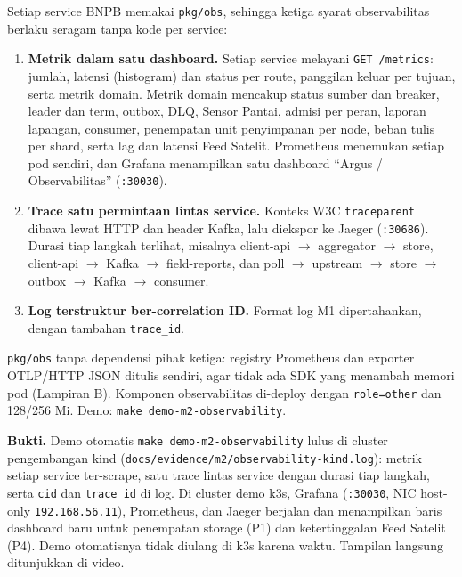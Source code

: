 Setiap service BNPB memakai \texttt{pkg/\allowbreak{}obs}, sehingga ketiga syarat observabilitas berlaku seragam tanpa kode per service:


\begin{enumerate}
\item \textbf{Metrik dalam satu dashboard.} Setiap service melayani \texttt{GET /\allowbreak{}metrics}: jumlah, latensi (histogram) dan status per route, panggilan keluar per tujuan, serta metrik domain. Metrik domain mencakup status sumber dan breaker, leader dan term, outbox, DLQ, Sensor Pantai, admisi per peran, laporan lapangan, consumer, penempatan unit penyimpanan per node, beban tulis per shard, serta lag dan latensi Feed Satelit. Prometheus menemukan setiap pod sendiri, dan Grafana menampilkan satu dashboard ``Argus / Observabilitas'' (\texttt{:30030}).
\item \textbf{Trace satu permintaan lintas service.} Konteks W3C \texttt{traceparent} dibawa lewat HTTP dan header Kafka, lalu diekspor ke Jaeger (\texttt{:30686}). Durasi tiap langkah terlihat, misalnya client-api $\rightarrow$ aggregator $\rightarrow$ store, client-api $\rightarrow$ Kafka $\rightarrow$ field-reports, dan poll $\rightarrow$ upstream $\rightarrow$ store $\rightarrow$ outbox $\rightarrow$ Kafka $\rightarrow$ consumer.
\item \textbf{Log terstruktur ber-correlation ID.} Format log M1 dipertahankan, dengan tambahan \texttt{trace\_\allowbreak{}id}.
\end{enumerate}

\texttt{pkg/\allowbreak{}obs} tanpa dependensi pihak ketiga: registry Prometheus dan exporter OTLP/HTTP JSON ditulis sendiri, agar tidak ada SDK yang menambah memori pod (Lampiran B). Komponen observabilitas di-deploy dengan \texttt{role=\allowbreak{}other} dan 128/256 Mi. Demo: \texttt{make demo-\allowbreak{}m2-\allowbreak{}observability}.


\textbf{Bukti.} Demo otomatis \texttt{make demo-\allowbreak{}m2-\allowbreak{}observability} lulus di cluster pengembangan kind (\texttt{docs/\allowbreak{}evidence/\allowbreak{}m2/\allowbreak{}observability-\allowbreak{}kind.\allowbreak{}log}): metrik setiap service ter-scrape, satu trace lintas service dengan durasi tiap langkah, serta \texttt{cid} dan \texttt{trace\_\allowbreak{}id} di log. Di cluster demo k3s, Grafana (\texttt{:30030}, NIC host-only \texttt{192.\allowbreak{}168.\allowbreak{}56.\allowbreak{}11}), Prometheus, dan Jaeger berjalan dan menampilkan baris dashboard baru untuk penempatan storage (P1) dan ketertinggalan Feed Satelit (P4). Demo otomatisnya tidak diulang di k3s karena waktu. Tampilan langsung ditunjukkan di video.


